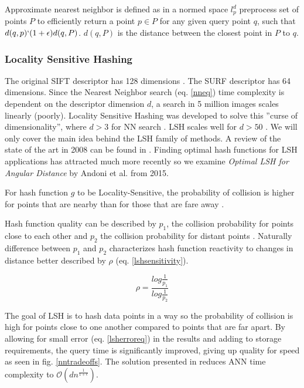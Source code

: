 \documentclass[english,12pt,a4paper,pdftex,elec,utf8]{aaltothesis}
\begin{document}
Approximate nearest neighbor is defined as in a normed space $l_p^d$ preprocess set of points $P$ to efficiently return a point $p\in P$ for any given query point $q$, such that $d(q,p) \lq (1 + \epsilon)d(q,P)$. $d(q, P)$ is the distance between the closest point in $P$ to $q$. \cite{Gionis1999}

\subsubsection{Locality Sensitive Hashing}
The original SIFT descriptor has 128 dimensions \cite{Lowe1999}.  The SURF descriptor has 64 dimensions. Since the Nearest Neighbor search (eq. \ref{nneq}) time complexity is dependent on the descriptor dimension $d$, a search in 5 million images scales linearly (poorly). Locality Sensitive Hashing was developed to solve this ''curse of dimensionality'', where $d > 3$ for NN search \cite{Gionis1999}. LSH scales well for $d > 50$ \cite{Gionis1999}. We will only cover the main idea behind the LSH family of methods. A review of the state of the art in 2008 can be found in \cite{Andoni2008}. Finding optimal hash functions for LSH applications has attracted much more recently so we examine \emph{Optimal LSH for Angular Distance} \cite{Andoni2015} by Andoni et al. from 2015.

For hash function $g$ to be Locality-Sensitive, the probability of collision is higher for points that are nearby than for those that are fare away \cite{Andoni2015}.

Hash function quality can be described by $p_1$, the collision probability for points close to each other and $p_2$ the collision probability for distant points \cite{Andoni2015}. Naturally difference between $p_1$ and $p_2$ characterizes hash function reactivity to changes in distance better described by $\rho$ (eq. \ref{lshsensitivity}).

\begin{equation}
  \label{lshsensitivity}
  \rho = \frac{log\frac{1}{p_1}}{log\frac{1}{p_2}}
  \end{equation}

The goal of LSH is to hash data points in a way so the probability of collision is high for points close to one another compared to points that are far apart. By allowing for small error (eq. \ref{lsherroreq}) in the results and adding to storage requirements, the query time is significantly improved, giving up quality for speed as seen in fig. \ref{nntradeoffs}. \cite{Gionis1999} The solution presented in \cite{Gionis1999} reduces ANN time complexity to $\mathcal{O}(dn^{\frac{1}{1+\epsilon}})$.
\end{document}
